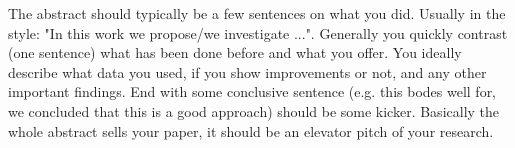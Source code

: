 The abstract should typically be a few sentences on what you did. Usually in the style: "In this work we propose/we investigate ...". Generally you quickly contrast (one sentence) what has been done before and what you offer. You ideally describe what data you used, if you show improvements or not, and any other important findings. End with some conclusive sentence (e.g. this bodes well for, we concluded that this is a good approach) should be some kicker. Basically the whole abstract sells your paper, it should be an elevator pitch of your research.
